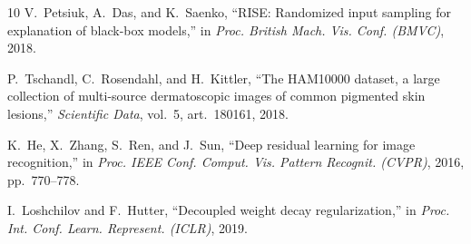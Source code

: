 \documentclass[conference]{IEEEtran}
\begin{document}
\begin{thebibliography}{10}
V.~Petsiuk, A.~Das, and K.~Saenko, ``RISE: Randomized input sampling for
explanation of black-box models,'' in \emph{Proc. British Mach. Vis. Conf.
(BMVC)}, 2018.

P.~Tschandl, C.~Rosendahl, and H.~Kittler, ``The HAM10000 dataset, a large
collection of multi-source dermatoscopic images of common pigmented skin
lesions,'' \emph{Scientific Data}, vol.~5, art.~180161, 2018.

K.~He, X.~Zhang, S.~Ren, and J.~Sun, ``Deep residual learning for image
recognition,'' in \emph{Proc. IEEE Conf. Comput. Vis. Pattern Recognit.
(CVPR)}, 2016, pp.~770--778.

I.~Loshchilov and F.~Hutter, ``Decoupled weight decay regularization,'' in
\emph{Proc. Int. Conf. Learn. Represent. (ICLR)}, 2019.

\end{thebibliography}
\end{document}
